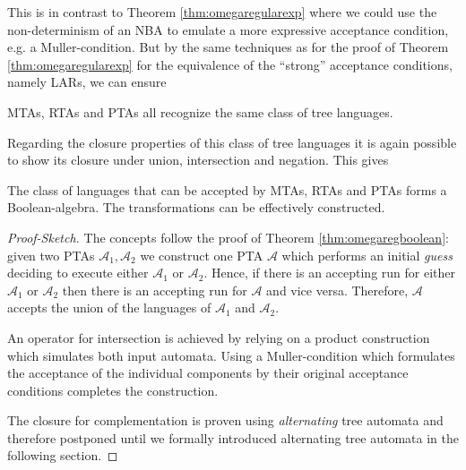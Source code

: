This is in contrast to Theorem \ref{thm:omegaregularexp} where we could use the
non-determinism of an \ac{NBA} to emulate a more expressive acceptance 
condition, e.g. a Muller-condition. But by the same techniques as for the proof 
of Theorem \ref{thm:omegaregularexp} for the equivalence of the 
\enquote{strong} acceptance conditions, namely \acp{LAR}, we can ensure
\begin{theorem}
  \cite[Theorem 8.7]{AutoLogInfGames}
  \acp{MTA}, \acp{RTA} and \acp{PTA} all recognize the same class of tree
  languages.
  \label{thm:treeautoequiv}
\end{theorem}
Regarding the closure properties of this class of tree languages it is again
possible to show its closure under union, intersection and negation. This gives
\begin{theorem}
  \cite[Theorem 1.3]{SOTheoAndTrees}
  \cite[Theorem 1.5]{SOTheoAndTrees}
  The class of languages that can be accepted by \acp{MTA}, \acp{RTA} and 
  \acp{PTA} forms a Boolean-algebra. The transformations can be effectively
  constructed.
  \label{thm:treeautoboolean}
\end{theorem}
\begin{proof}[Proof-Sketch]
  The concepts follow the proof of Theorem \ref{thm:omegaregboolean}: given two
  \acp{PTA} $\mathcal{A}_{1}, \mathcal{A}_{2}$ we construct one \ac{PTA}
  $\mathcal{A}$ which performs an initial \emph{guess} deciding to execute
  either $\mathcal{A}_{1}$ or $\mathcal{A}_{2}$. Hence, if there is an
  accepting run for either $\mathcal{A}_{1}$ or $\mathcal{A}_{2}$ then there is
  an accepting run for $\mathcal{A}$ and vice versa. Therefore, $\mathcal{A}$
  accepts the union of the languages of $\mathcal{A}_{1}$ and
  $\mathcal{A}_{2}$.

  An operator for intersection is achieved by relying on a product construction
  which simulates both input automata. Using a Muller-condition which
  formulates the acceptance of the individual components by their original
  acceptance conditions completes the construction. 

  The closure for complementation is proven using \emph{alternating} tree
  automata and therefore postponed until we formally introduced alternating
  tree automata in the following section.
\end{proof}


